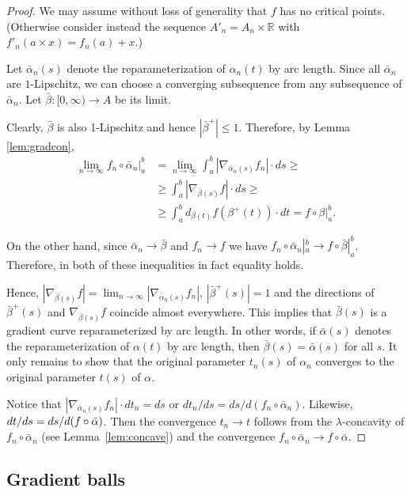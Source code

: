 \documentclass{amsart}
\begin{document}
\begin{proof}
We may assume without loss of generality  that $f$ has no critical points.
(Otherwise consider instead the  sequence $A'_n=A_n\times\mathbb{R}$ with $f'_n(a\times x)=f_n(a)+x$.)

Let $\bar\alpha_n(s)$ denote the reparameterization of $\alpha_n(t)$
by arc length.
Since all $\bar\alpha_n$ are $1$-Lipschitz,
 we can choose a converging subsequence from
any subsequence of $\bar\alpha_n$.
Let $\bar\beta\colon [0,\infty)\to A$ be its limit.

Clearly, $\bar\beta$ is also 1-Lipschitz and hence $|\bar\beta^+|\le 1$.
Therefore, by Lemma \ref{lem:gradcon},
\begin{align*}
\lim_{n\to\infty}f_n\circ\bar\alpha_n|_a^b
&=
\lim_{n\to\infty}\int_a^b|\nabla_{\bar\alpha_n(s)} f_n|{\cdot}ds\ge
\\
&\ge\int_a^b|\nabla_{\bar\beta(s)} f|{\cdot}ds\ge
\\
&\ge
\int_a^b d_{\beta(t)} f(\beta^+(t)){\cdot} dt=f\circ\beta|_a^b.
\end{align*}

On the other hand, since $\bar\alpha_n\to\bar\beta$ and $f_n\to f$ we have
$f_n\circ\bar\alpha_n|_a^b \to f\circ\bar\beta|_a^b$.
Therefore, in both of these inequalities in fact equality holds.

Hence, $|\nabla_{\bar\beta(s)} f|= \lim_{n\to\infty} |\nabla_{\bar\alpha_n(s)} f_n|$,
$|\bar\beta^+(s)|= 1$
and the directions of $\bar\beta^+(s)$ and  $\nabla_{\bar\beta(s)} f$
coincide almost everywhere.
This implies that $\bar\beta(s)$ is a gradient curve reparameterized by
arc length.
In other words, if $\bar\alpha(s)$ denotes the
reparameterization of $\alpha(t)$
by arc length,
then $\bar\beta(s)=\bar\alpha(s)$ for all $s$.
It only remains to show that the original
parameter $t_n(s)$ of $\alpha_n$ converges to the original
parameter $t(s)$ of $\alpha$.

Notice that $|\nabla_{\bar\alpha_n(s)} f_n|{\cdot} dt_n=ds$ or
$dt_n/ds=ds/d(f_n\circ\bar\alpha_n)$.
Likewise, $dt/ds\z=ds/d(f\circ\bar\alpha)$.
Then the convergence $t_n\to t$ follows from the $\lambda$-concavity of
$f_n\circ\bar\alpha_n$ (see Lemma~\ref{lem:concave})
and the convergence $f_n\circ\bar\alpha_n\to f\circ\bar\alpha.$
\end{proof}

\subsection{Gradient balls}
\end{document}
